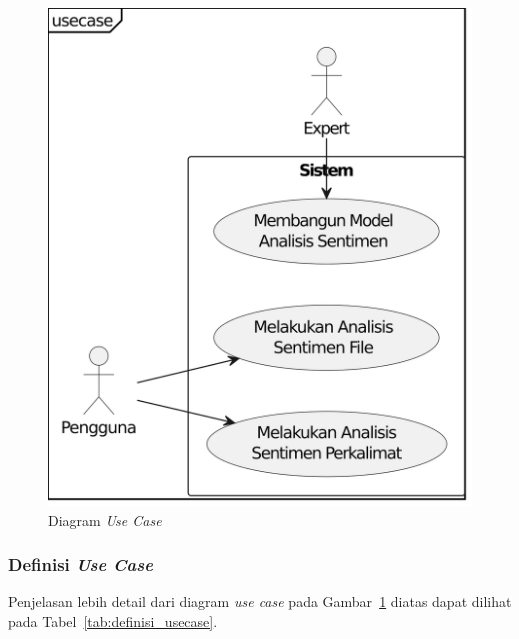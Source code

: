 \begin{figure}[H]
  \centering
  \includegraphics[scale=1]{assets/usecase_diagram.png}
  \caption{Diagram \emph{Use Case}}
  \label{fig:usecase_diagram}
\end{figure}

\subsubsection{Definisi \emph{Use Case}}
Penjelasan lebih detail dari diagram \emph{use case} pada Gambar~\ref{fig:usecase_diagram} diatas dapat dilihat
pada Tabel~\ref{tab:definisi_usecase}.


